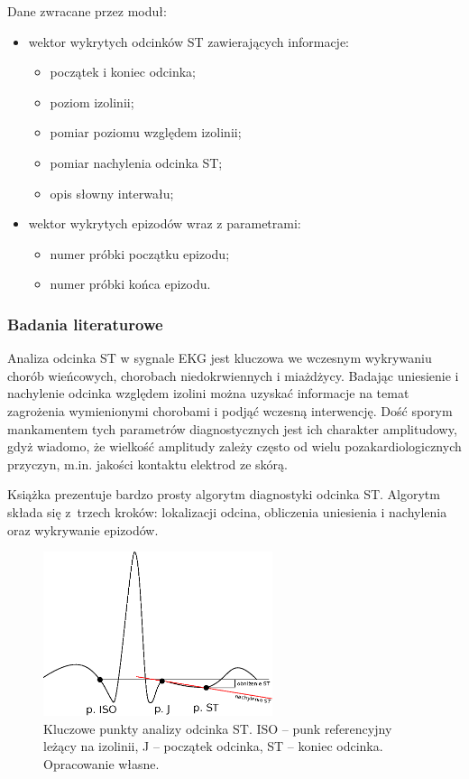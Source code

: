\documentclass[a4paper, 11pt]{article}
\begin{document}
Dane zwracane przez moduł:
\begin{itemize}
  \item wektor wykrytych odcinków ST zawierających informacje:
  \begin{itemize}
    \item początek i koniec odcinka;
    \item poziom izolinii;
    \item pomiar poziomu względem izolinii;
    \item pomiar nachylenia odcinka ST;
    \item opis słowny interwału;
  \end{itemize}
  \item wektor wykrytych epizodów wraz z parametrami:
  \begin{itemize}
    \item numer próbki początku epizodu;
    \item numer próbki końca epizodu.
  \end{itemize}
\end{itemize}

\subsubsection{Badania literaturowe}
\label{sec:st_interval:papers}

Analiza odcinka ST w sygnale EKG jest kluczowa we wczesnym wykrywaniu chorób
wieńcowych, chorobach niedokrwiennych i miażdżycy. Badając uniesienie i
nachylenie odcinka względem izolini można uzyskać informacje na temat
zagrożenia wymienionymi chorobami i podjąć wczesną interwencję. Dość sporym
mankamentem tych parametrów diagnostycznych jest ich charakter amplitudowy,
gdyż wiadomo, że wielkość amplitudy zależy często od wielu pozakardiologicznych
przyczyn, m.in. jakości kontaktu elektrod ze skórą.

Książka \cite{AUGUST1} prezentuje bardzo prosty algorytm diagnostyki odcinka
ST. Algorytm składa się z~trzech kroków: lokalizacji odcina, obliczenia uniesienia i
nachylenia oraz wykrywanie epizodów.

\begin{figure}[h!]
  \centering
  \includegraphics[width=0.6\textwidth]{include/ecg_st}
  \caption{Kluczowe punkty analizy odcinka ST. ISO -- punk referencyjny leżący
  na izolinii, J -- początek odcinka, ST -- koniec odcinka. Opracowanie własne.}
  \label{fig:ecg_st}
\end{figure}
\end{document}
